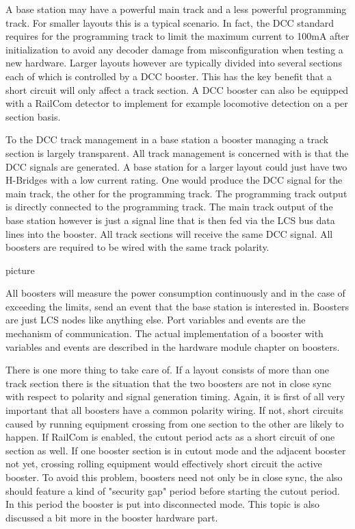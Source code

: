 A base station may have a powerful main track and a less powerful programming track. For smaller layouts this is a typical scenario. In fact, the DCC standard requires for the programming track to limit the maximum current to 100mA after initialization to avoid any decoder damage from misconfiguration when testing a new hardware. Larger layouts however are typically divided into several sections each of which is controlled by a DCC booster. This has the key benefit that a short circuit will only affect a track section. A DCC booster can also be equipped with a RailCom detector to implement for example locomotive detection on a per section basis.

To the DCC track management in a base station a booster managing a track section is largely transparent. All track management is concerned with is that the DCC signals are generated. A base station for a larger layout could just have two H-Bridges with a low current rating. One would produce the DCC signal for the main track, the other for the programming track. The programming track output is directly connected to the programming track. The main track output of the base station however is just a signal line that is then fed via the LCS bus data lines into the booster. All track sections will receive the same DCC signal. All boosters are required to be wired with the same track polarity.

picture 

\begin{figure}[h]
    \centering
\end{figure}

All boosters will measure the power consumption continuously and in the case of exceeding the limits, send an event that the base station is interested in. Boosters are just LCS nodes like anything else. Port variables and events are the mechanism of communication. The actual implementation of a booster with variables and events are described in the hardware module chapter on boosters.

There is one more thing to take care of. If a layout consists of more than one track section there is the situation that the two boosters are not in close sync with respect to polarity and signal generation timing. Again, it is first of all very important that all boosters have a common polarity wiring. If not, short circuits caused by running equipment crossing from one section to the other are likely to happen. If RailCom is enabled, the cutout period acts as a short circuit of one section as well. If one booster section is in cutout mode and the adjacent booster not yet, crossing rolling equipment would effectively short circuit the active booster. To avoid this problem, boosters need not only be in close sync, the also should feature a kind of "security gap" period before starting the cutout period. In this period the booster is put into disconnected mode. This topic is also discussed a bit more in the booster hardware part.

